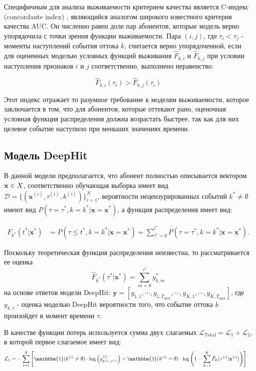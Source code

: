\documentclass{article}
\begin{document}
Специфичным для анализа выживаемости критерием качества является C-индекс (concordante index) \cite{Alabdallah2022}, являющийся аналогом широкого известного критерия качества AUC. Он численно равен доле пар абонентов, которые модель верно упорядочила с точки зрения функции выживаемости. Пара $(i,j)$, где $\tau_i < \tau_j$ - моменты наступлений события оттока $k$, считается верно упорядоченной, если для оцененных моделью условных функций выживания $\hat{F}_{k,i}$ и $\hat{F}_{k,j}$ при условии наступления признаков $i$ и $j$ соответственно, выполнено неравенство: 

$$ \hat{F}_{k,i}(\tau_i ) >  \hat{F}_{k,j}(\tau_i ) $$ 

Этот индекс отражает то разумное требование к моделям выживаемости, которое заключается в том, что для абонентов, которые оттекают рано, оценочная условная функция распределения должна возрастать быстрее, так как для них целевое событие наступило при меньших значениях времени. 

\subsection{Модель DeepHit}

В данной модели предполагается, что абонент полностью описывается вектором $\bold{x} \in X$, соответственно обучающая выборка имеет вид $\mathcal{D}=\{(\mathbf{x}^{(i)},\tau^{(i)},k^{(i)})\}_{i=1}^N$, вероятности нецензурированных событий $k^* \neq \emptyset $ имеют вид $P(\tau=\tau^*,k=k^*|\mathbf{x}=\mathbf{x}^*)$, а функция распределения имеет вид:

\begin{align}
	F_{k^*}(t^*|\mathbf{x}^*) &= P(\tau\leq t^*,k=k^*|\mathbf{x}=\mathbf{x}^*) 
	= \sum_{\tau^*=0}^{t^*} P(\tau=\tau^*,k=k^*|\mathbf{x}=\mathbf{x}^*).
\end{align}

Поскольку теоретическая функция распределения неизвестна, то рассматривается ее оценка $$\hat{F}_{k^*}(\tau^*|\mathbf{x}^*)=\sum_{m=0}^{\tau^*}y_{k,m}^*$$ на основе ответов модели DeepHit: $\mathbf{y}=[y_{1,1},\cdots,y_{1,T_{\max}},\cdots,y_{K,1},\cdots,y_{K,T_{\max}}]$, где $y_{k,\tau}$ - оценка моделью DeepHit вероятности того, что событие оттока $k$ произойдет в момент времени $\tau$.

В качестве функции потерь используется сумма двух слагаемых $\mathcal{L}_{\mathrm{Total}}=\mathcal{L}_1+\mathcal{L}_2$, в которой первое слагаемое имеет вид: 
\begin{equation}
	\begin{aligned}
		\mathcal{L}_{1} & = -\sum_{i=1}^N \left[\mathbbm{1}(k^{(i)}\neq\emptyset)\cdot\log\left(y_{k^{(i)},\tau^{(i)}}^{(i)}\right)  + \mathbbm{1}(k^{(i)}=\emptyset)\cdot\log\left(1-\sum_{k=1}^K\hat{F}_k(\tau^{(i)}|\mathbf{x}^{(i)})\right)\right]
	\end{aligned}
\end{equation}
\end{document}
